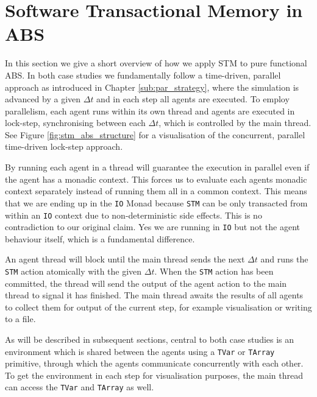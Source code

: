 \section{Software Transactional Memory in ABS}
\label{sec:stm_abs}
In this section we give a short overview of how we apply STM to pure functional ABS. In both case studies we fundamentally follow a time-driven, parallel approach as introduced in Chapter \ref{sub:par_strategy}, where the simulation is advanced by a given $\Delta t$ and in each step all agents are executed. To employ parallelism, each agent runs within its own thread and agents are executed in lock-step, synchronising between each $\Delta t$, which is controlled by the main thread. See Figure \ref{fig:stm_abs_structure} for a visualisation of the concurrent, parallel time-driven lock-step approach.

By running each agent in a thread will guarantee the execution in parallel even if the agent has a monadic context. This forces us to evaluate each agents monadic context separately instead of running them all in a common context. This means that we are ending up in the \texttt{IO} Monad because \texttt{STM} can be only transacted from within an \texttt{IO} context due to non-deterministic side effects. This is no contradiction to our original claim. Yes we are running in \texttt{IO} but not the agent behaviour itself, which is a fundamental difference.

An agent thread will block until the main thread sends the next $\Delta t$ and runs the \texttt{STM} action atomically with the given $\Delta t$. When the \texttt{STM} action has been committed, the thread will send the output of the agent action to the main thread to signal it has finished. The main thread awaits the results of all agents to collect them for output of the current step, for example visualisation or writing to a file.

As will be described in subsequent sections, central to both case studies is an environment which is shared between the agents using a \texttt{TVar} or \texttt{TArray} primitive, through which the agents communicate concurrently with each other. To get the environment in each step for visualisation purposes, the main thread can access the \texttt{TVar} and \texttt{TArray} as well. 

